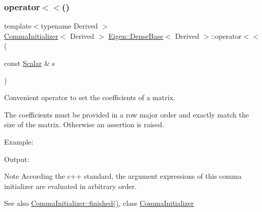 \subsubsection{\texorpdfstring{operator$<$$<$()}{operator<<()}\hspace{0.1cm}{\footnotesize\ttfamily [2/2]}}
{\footnotesize\ttfamily template$<$typename Derived $>$ \\
\mbox{\hyperlink{struct_eigen_1_1_comma_initializer}{Comma\+Initializer}}$<$ Derived $>$ \mbox{\hyperlink{class_eigen_1_1_dense_base}{Eigen\+::\+Dense\+Base}}$<$ Derived $>$\+::operator$<$$<$ (\begin{DoxyParamCaption}\item[{const \mbox{\hyperlink{class_eigen_1_1_dense_base_a5feed465b3a8e60c47e73ecce83e39a2}{Scalar}} \&}]{s }\end{DoxyParamCaption})\hspace{0.3cm}{\ttfamily [inline]}}

\label{class_eigen_1_1_dense_base_MatrixBaseCommaInitRef}%
%
Convenient operator to set the coefficients of a matrix.

The coefficients must be provided in a row major order and exactly match the size of the matrix. Otherwise an assertion is raised.

Example\+: 
\begin{DoxyCodeInclude}{0}
\end{DoxyCodeInclude}
 Output\+: 
\begin{DoxyVerbInclude}
\end{DoxyVerbInclude}


\begin{DoxyNote}{Note}
According the c++ standard, the argument expressions of this comma initializer are evaluated in arbitrary order.
\end{DoxyNote}
\begin{DoxySeeAlso}{See also}
\mbox{\hyperlink{struct_eigen_1_1_comma_initializer_a3be7de7fb3e8d3c4d3063f480181b17f}{Comma\+Initializer\+::finished()}}, class \mbox{\hyperlink{struct_eigen_1_1_comma_initializer}{Comma\+Initializer}} 
\end{DoxySeeAlso}
\mbox{\label{class_eigen_1_1_dense_base_a581a7a353bd007b5352f11688e3bc5fa}} 
